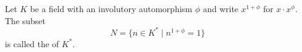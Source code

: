 Let $K$ be a field with an involutory automorphism $\phi$ and write $x^{1+\phi}$ for $x \cdot x^{\phi}$. The subset
$$N = \{ n \in K^* \mid n^{1+\phi} = 1 \}$$
is called the  of $K^*$.
